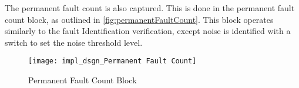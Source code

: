 \par The permanent fault count is also captured. This is done in the permanent fault count block, as outlined in \autoref{fig:permanentFaultCount}. This block operates similarly to the fault Identification verification, except noise is identified with a switch to set the noise threshold level. 
 \begin{figure}[H]
    \texttt{[image: impl\_dsgn\_Permanent Fault Count]}
    \caption{Permanent Fault Count Block}
    \label{fig:permanentFaultCount}
\end{figure}